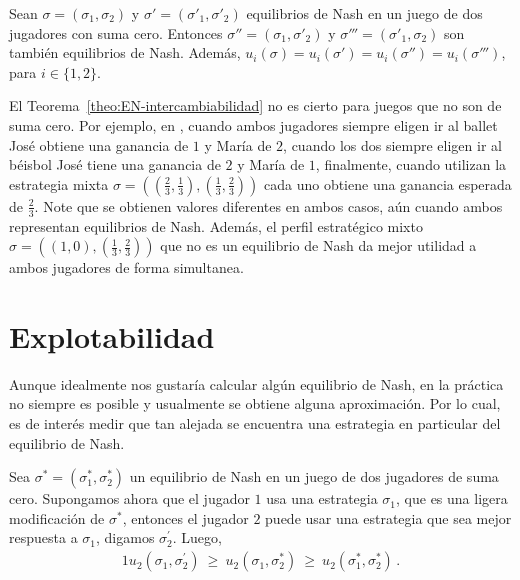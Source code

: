 \begin{theorem}
\label{theo:EN-intercambiabilidad}
Sean $\sigma = (\sigma_1, \sigma_2)$ y $\sigma' = (\sigma'_1, \sigma'_2)$ equilibrios de Nash en un juego de dos jugadores con suma cero. Entonces $\sigma'' = (\sigma_1, \sigma'_2)$ y $\sigma''' = (\sigma'_1, \sigma_2)$ son también equilibrios de Nash. Además, $u_i(\sigma) = u_i(\sigma') = u_i(\sigma'') = u_i(\sigma''')$, para $i \in \{1, 2\}$.
\end{theorem}

El Teorema~\ref{theo:EN-intercambiabilidad} no es cierto para juegos que no son de suma cero. Por ejemplo, en , cuando ambos jugadores siempre eligen ir al ballet José obtiene una ganancia de $1$ y María de $2$, cuando los dos siempre eligen ir al béisbol José tiene una ganancia de $2$ y María de $1$, finalmente, cuando utilizan la estrategia mixta $\sigma = \left(\left(\frac{2}{3}, \frac{1}{3}\right), \left(\frac{1}{3}, \frac{2}{3}\right)\right)$ cada uno obtiene una ganancia esperada de $\frac{2}{3}$. Note que se obtienen valores diferentes en ambos casos, aún cuando ambos representan equilibrios de Nash. Además, el perfil estratégico mixto $\sigma = \left((1, 0), \left(\frac{1}{3}, \frac{2}{3}\right)\right)$ que no es un equilibrio de Nash da mejor utilidad a ambos jugadores de forma simultanea.

\section{Explotabilidad}
\label{section:explotabilidad}

Aunque idealmente nos gustaría calcular algún equilibrio de Nash, en la práctica no siempre es posible y usualmente se obtiene alguna aproximación. Por lo cual, es de interés medir que tan alejada se encuentra una estrategia en particular del equilibrio de Nash.

Sea $\sigma^* = (\sigma^*_1, \sigma^*_2)$ un equilibrio de Nash en un juego de dos jugadores de suma cero. Supongamos ahora que el jugador $1$  usa una estrategia $\sigma_1$, que es una ligera modificación de $\sigma^*$, entonces el jugador $2$ puede usar una estrategia que sea mejor respuesta a $\sigma_1$, digamos $\sigma^{\prime}_2$. Luego,
\begin{alignat}{1}
u_2(\sigma_1, \sigma^{\prime}_2)\ \geq\ u_2(\sigma_1, \sigma^*_2)\ \geq\ u_2(\sigma^*_1, \sigma^*_2) \,.
\end{alignat}

